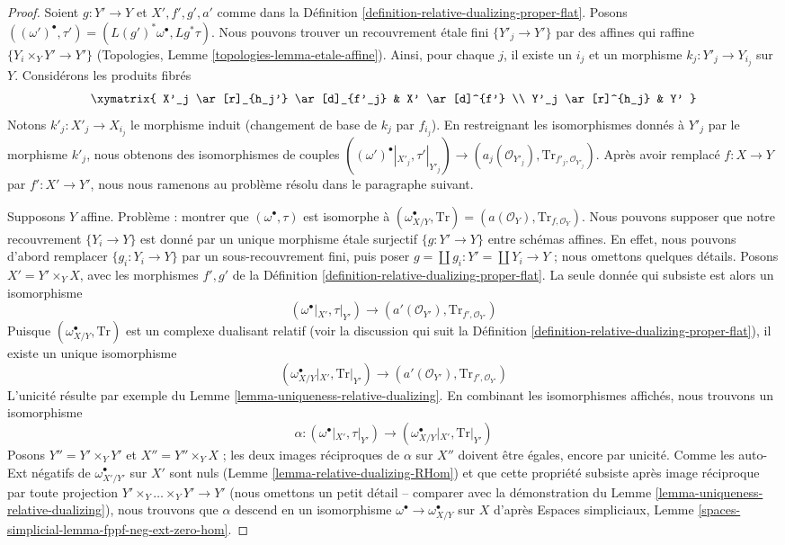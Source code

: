 \begin{proof}
Soient $g : Y' \to Y$ et $X', f', g', a'$ comme dans la
Définition \ref{definition-relative-dualizing-proper-flat}.
Posons $((\omega')^\bullet, \tau') = (L(g')^*\omega^\bullet, Lg^*\tau)$.
Nous pouvons trouver un recouvrement \'etale fini
$\{Y'_j \to Y'\}$ par des affines qui raffine $\{Y_i \times_Y Y' \to Y'\}$
(Topologies, Lemme \ref{topologies-lemma-etale-affine}).
Ainsi, pour chaque $j$, il existe un $i_j$ et un morphisme
$k_j : Y'_j \to Y_{i_j}$ sur $Y$. Considérons les produits fibrés
$$
\xymatrix{
X'_j \ar[r]_{h_j'} \ar[d]_{f'_j} &
X' \ar[d]^{f'} \\
Y'_j \ar[r]^{h_j} & Y'
}
$$
Notons $k'_j : X'_j \to X_{i_j}$ le morphisme induit (changement de base
de $k_j$ par $f_{i_j}$). En restreignant les isomorphismes donnés à $Y'_j$
par le morphisme $k'_j$, nous obtenons des isomorphismes de couples
$((\omega')^\bullet|_{X'_j}, \tau'|_{Y'_j})
\to (a_j(\mathcal{O}_{Y'_j}), \text{Tr}_{f'_j, \mathcal{O}_{Y'_j}})$.
Après avoir remplacé $f : X \to Y$ par $f' : X' \to Y'$, nous nous ramenons au
problème résolu dans le paragraphe suivant.

\medskip\noindent
Supposons $Y$ affine. Problème : montrer que $(\omega^\bullet, \tau)$ est
isomorphe à $(\omega_{X/Y}^\bullet, \text{Tr}) =
(a(\mathcal{O}_Y), \text{Tr}_{f, \mathcal{O}_Y})$.
Nous pouvons supposer que notre recouvrement $\{Y_i \to Y\}$ est donné par un unique
morphisme \'etale surjectif $\{g : Y' \to Y\}$ entre schémas affines.
En effet, nous pouvons d'abord remplacer $\{g_i: Y_i \to Y\}$ par un sous-recouvrement
fini, puis poser $g = \coprod g_i :  Y' = \coprod Y_i \to Y$ ;
nous omettons quelques détails. Posons $X' = Y' \times_Y X$, avec les morphismes
$f', g'$ de la Définition \ref{definition-relative-dualizing-proper-flat}.
La seule donnée qui subsiste est alors un isomorphisme
$$
(\omega^\bullet|_{X'}, \tau|_{Y'}) \to
(a'(\mathcal{O}_{Y'}), \text{Tr}_{f', \mathcal{O}_{Y'}})
$$
Puisque $(\omega_{X/Y}^\bullet, \text{Tr})$ est un complexe dualisant relatif
(voir la discussion qui suit la
Définition \ref{definition-relative-dualizing-proper-flat}),
il existe un unique isomorphisme
$$
(\omega_{X/Y}^\bullet|_{X'}, \text{Tr}|_{Y'}) \to
(a'(\mathcal{O}_{Y'}), \text{Tr}_{f', \mathcal{O}_{Y'}})
$$
L'unicité résulte par exemple du Lemme \ref{lemma-uniqueness-relative-dualizing}.
En combinant les isomorphismes affichés, nous trouvons un isomorphisme
$$
\alpha :
(\omega^\bullet|_{X'}, \tau|_{Y'}) \to
(\omega_{X/Y}^\bullet|_{X'}, \text{Tr}|_{Y'})
$$
Posons $Y'' = Y' \times_Y Y'$ et $X'' = Y'' \times_Y X$ ; les deux
images réciproques de $\alpha$ sur $X''$ doivent être égales, encore par unicité.
Comme les auto-Ext négatifs de
$\omega_{X'/Y'}^\bullet$ sur $X'$ sont nuls (Lemme \ref{lemma-relative-dualizing-RHom})
et que cette propriété subsiste après image réciproque par toute projection
$Y' \times_Y \ldots \times_Y Y' \to Y'$ (nous omettons un petit détail -- comparer
avec la démonstration du Lemme \ref{lemma-uniqueness-relative-dualizing}),
nous trouvons que $\alpha$ descend en un isomorphisme
$\omega^\bullet \to \omega_{X/Y}^\bullet$
sur $X$ d'après Espaces simpliciaux, Lemme
\ref{spaces-simplicial-lemma-fppf-neg-ext-zero-hom}.
\end{proof}

